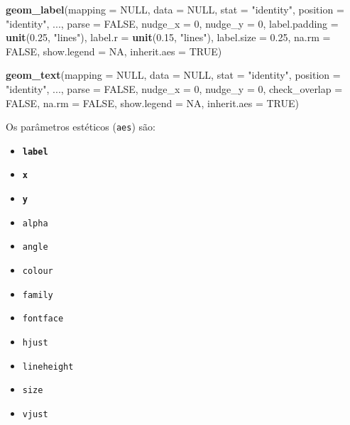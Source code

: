 \documentclass[]{book}
\newenvironment{Shaded}{\begin{snugshade}}{\end{snugshade}}
\newcommand{\KeywordTok}[1]{\textcolor[rgb]{0.13,0.29,0.53}{\textbf{#1}}}
\newcommand{\DataTypeTok}[1]{\textcolor[rgb]{0.13,0.29,0.53}{#1}}
\newcommand{\DecValTok}[1]{\textcolor[rgb]{0.00,0.00,0.81}{#1}}
\newcommand{\FloatTok}[1]{\textcolor[rgb]{0.00,0.00,0.81}{#1}}
\newcommand{\StringTok}[1]{\textcolor[rgb]{0.31,0.60,0.02}{#1}}
\newcommand{\OtherTok}[1]{\textcolor[rgb]{0.56,0.35,0.01}{#1}}
\newcommand{\NormalTok}[1]{#1}
\providecommand{\tightlist}{%
  \setlength{\itemsep}{0pt}\setlength{\parskip}{0pt}}
\begin{document}
\begin{Shaded}
\begin{Highlighting}[]
\KeywordTok{geom_label}\NormalTok{(}\DataTypeTok{mapping =} \OtherTok{NULL}\NormalTok{, }\DataTypeTok{data =} \OtherTok{NULL}\NormalTok{, }\DataTypeTok{stat =} \StringTok{"identity"}\NormalTok{, }\DataTypeTok{position =} \StringTok{"identity"}\NormalTok{,}
\NormalTok{           ..., }\DataTypeTok{parse =} \OtherTok{FALSE}\NormalTok{, }\DataTypeTok{nudge_x =} \DecValTok{0}\NormalTok{, }\DataTypeTok{nudge_y =} \DecValTok{0}\NormalTok{,}
           \DataTypeTok{label.padding =} \KeywordTok{unit}\NormalTok{(}\FloatTok{0.25}\NormalTok{, }\StringTok{"lines"}\NormalTok{), }\DataTypeTok{label.r =} \KeywordTok{unit}\NormalTok{(}\FloatTok{0.15}\NormalTok{, }\StringTok{"lines"}\NormalTok{),}
           \DataTypeTok{label.size =} \FloatTok{0.25}\NormalTok{, }\DataTypeTok{na.rm =} \OtherTok{FALSE}\NormalTok{, }\DataTypeTok{show.legend =} \OtherTok{NA}\NormalTok{, }\DataTypeTok{inherit.aes =} \OtherTok{TRUE}\NormalTok{)}

\KeywordTok{geom_text}\NormalTok{(}\DataTypeTok{mapping =} \OtherTok{NULL}\NormalTok{, }\DataTypeTok{data =} \OtherTok{NULL}\NormalTok{, }\DataTypeTok{stat =} \StringTok{"identity"}\NormalTok{, }\DataTypeTok{position =} \StringTok{"identity"}\NormalTok{,}
\NormalTok{          ..., }\DataTypeTok{parse =} \OtherTok{FALSE}\NormalTok{, }\DataTypeTok{nudge_x =} \DecValTok{0}\NormalTok{, }\DataTypeTok{nudge_y =} \DecValTok{0}\NormalTok{, }\DataTypeTok{check_overlap =} \OtherTok{FALSE}\NormalTok{,}
          \DataTypeTok{na.rm =} \OtherTok{FALSE}\NormalTok{, }\DataTypeTok{show.legend =} \OtherTok{NA}\NormalTok{, }\DataTypeTok{inherit.aes =} \OtherTok{TRUE}\NormalTok{)}
\end{Highlighting}
\end{Shaded}

Os parâmetros estéticos (\texttt{aes}) são:

\begin{itemize}
\tightlist
\item
  \textbf{\texttt{label}}
\item
  \textbf{\texttt{x}}
\item
  \textbf{\texttt{y}}
\item
  \texttt{alpha}
\item
  \texttt{angle}
\item
  \texttt{colour}
\item
  \texttt{family}
\item
  \texttt{fontface}
\item
  \texttt{hjust}
\item
  \texttt{lineheight}
\item
  \texttt{size}
\item
  \texttt{vjust}
\end{itemize}
\end{document}
